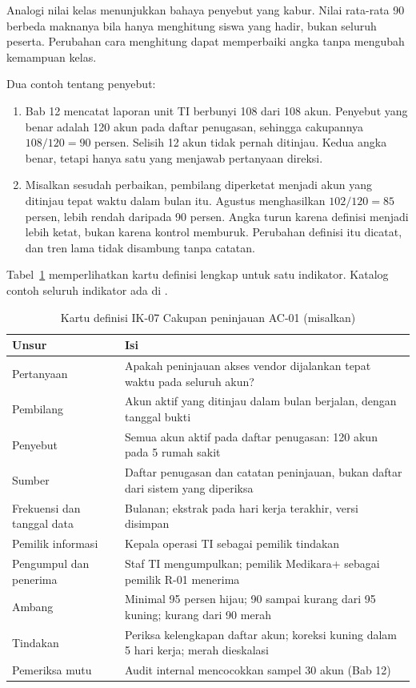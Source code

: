 Analogi nilai kelas menunjukkan bahaya penyebut yang kabur. Nilai rata-rata 90 berbeda maknanya
bila hanya menghitung siswa yang hadir, bukan seluruh peserta. Perubahan cara menghitung dapat
memperbaiki angka tanpa mengubah kemampuan kelas.

Dua contoh tentang penyebut:
\begin{enumerate}
  \item Bab 12 mencatat laporan unit TI berbunyi 108 dari 108 akun. Penyebut yang benar adalah 120
  akun pada daftar penugasan, sehingga cakupannya $108 / 120 = 90$ persen. Selisih 12 akun tidak
  pernah ditinjau. Kedua angka benar, tetapi hanya satu yang menjawab pertanyaan direksi.
  \item Misalkan sesudah perbaikan, pembilang diperketat menjadi akun yang ditinjau tepat waktu
  dalam bulan itu. Agustus menghasilkan $102 / 120 = 85$ persen, lebih rendah daripada 90 persen.
  Angka turun karena definisi menjadi lebih ketat, bukan karena kontrol memburuk. Perubahan definisi
  itu dicatat, dan tren lama tidak disambung tanpa catatan.
\end{enumerate}

Tabel~\ref{tab:ch13-definisi} memperlihatkan kartu definisi lengkap untuk satu indikator. Katalog
contoh seluruh indikator ada di .

\begin{table}[!htb]
  \centering\small
  \caption{Kartu definisi IK-07 Cakupan peninjauan AC-01 (misalkan)}\label{tab:ch13-definisi}
  \begin{tabularx}{\textwidth}{|>{\raggedright\arraybackslash}p{}|>{\raggedright\arraybackslash}X|}
    \hline
    \textbf{Unsur} & \textbf{Isi} \\ \hline
    Pertanyaan & Apakah peninjauan akses vendor dijalankan tepat waktu pada seluruh akun? \\ \hline
    Pembilang & Akun aktif yang ditinjau dalam bulan berjalan, dengan tanggal bukti \\ \hline
    Penyebut & Semua akun aktif pada daftar penugasan: 120 akun pada 5 rumah sakit \\ \hline
    Sumber & Daftar penugasan dan catatan peninjauan, bukan daftar dari sistem yang diperiksa \\
    \hline
    Frekuensi dan tanggal data & Bulanan; ekstrak pada hari kerja terakhir, versi disimpan \\ \hline
    Pemilik informasi & Kepala operasi TI sebagai pemilik tindakan \\ \hline
    Pengumpul dan penerima & Staf TI mengumpulkan; pemilik Medikara+ sebagai pemilik R-01 menerima
    \\ \hline
    Ambang & Minimal 95 persen hijau; 90 sampai kurang dari 95 kuning; kurang dari 90 merah \\
    \hline
    Tindakan & Periksa kelengkapan daftar akun; koreksi kuning dalam 5 hari kerja; merah dieskalasi
    \\ \hline
    Pemeriksa mutu & Audit internal mencocokkan sampel 30 akun (Bab 12) \\ \hline
  \end{tabularx}
\end{table}

